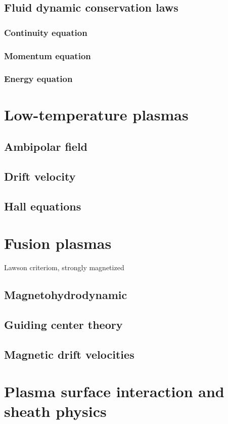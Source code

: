 		\subsection{Fluid dynamic conservation laws}
			\subsubsection{Continuity equation}
			\subsubsection{Momentum equation}
			\subsubsection{Energy equation}
	\section{Low-temperature plasmas}
		\subsection{Ambipolar field}
		\subsection{Drift velocity}
		\subsection{Hall equations}
	\section{Fusion plasmas}
	Lawson criteriom, strongly magnetized
		\subsection{Magnetohydrodynamic}
		\subsection{Guiding center theory}
		\subsection{Magnetic drift velocities}
	\section{Plasma surface interaction and sheath physics}
